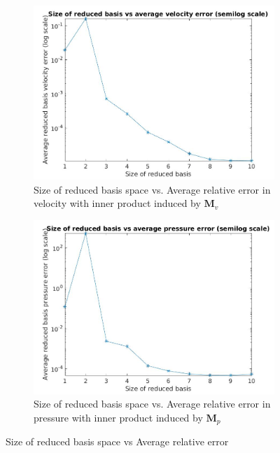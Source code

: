\documentclass[graybox]{svmult}
\begin{document}
\begin{figure}[H]
\begin{subfigure}{0.48\textwidth}
\includegraphics[width=\linewidth]{size_vs_average_reduced_basis_velocity_error_semilog.jpg}
\caption{Size of reduced basis space vs. Average relative error in velocity with inner product induced by $\bm{M}_v$} \label{error_vs_basis_velocity}
\end{subfigure}\hspace*{\fill}
\begin{subfigure}{0.48\textwidth}
\includegraphics[width=\linewidth]{size_vs_average_reduced_basis_pressure_error_semilog.jpg}
\caption{Size of reduced basis space vs. Average relative error in pressure with inner product induced by $\bm{M}_p$} \label{error_vs_basis_pressure}
\end{subfigure}
  \caption{Size of reduced basis space vs Average relative error} 
\label{error_vs_basis}
\end{figure}
\end{document}
